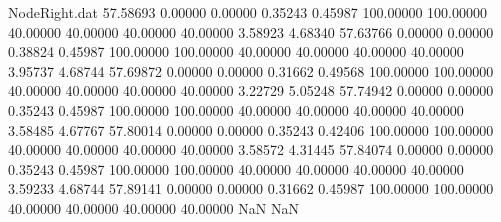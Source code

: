 \begin{filecontents}{NodeRight.dat}
  57.58693    0.00000    0.00000     0.35243    0.45987  100.00000  100.00000   40.00000   40.00000   40.00000   40.00000    3.58923    4.68340
  57.63766    0.00000    0.00000     0.38824    0.45987  100.00000  100.00000   40.00000   40.00000   40.00000   40.00000    3.95737    4.68744
  57.69872    0.00000    0.00000     0.31662    0.49568  100.00000  100.00000   40.00000   40.00000   40.00000   40.00000    3.22729    5.05248
  57.74942    0.00000    0.00000     0.35243    0.45987  100.00000  100.00000   40.00000   40.00000   40.00000   40.00000    3.58485    4.67767
  57.80014    0.00000    0.00000     0.35243    0.42406  100.00000  100.00000   40.00000   40.00000   40.00000   40.00000    3.58572    4.31445
  57.84074    0.00000    0.00000     0.35243    0.45987  100.00000  100.00000   40.00000   40.00000   40.00000   40.00000    3.59233    4.68744
  57.89141    0.00000    0.00000     0.31662    0.45987  100.00000  100.00000   40.00000   40.00000   40.00000   40.00000        NaN        NaN
\end{filecontents}
